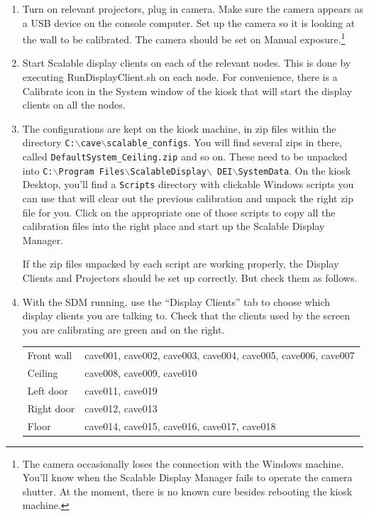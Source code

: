 \documentclass[11pt]{article}
\newcommand{\cmd}[1]{\texttt{#1}\xspace}
\newcommand{\menu}[1]{``#1''\xspace}
\newcommand{\button}[1]{\textsf{#1}\xspace}
\begin{document}
\begin{enumerate}

\item Turn on relevant projectors, plug in camera.  Make sure the camera
  appears as a USB device on the console computer.  Set up the camera
  so it is looking at the wall to be calibrated.  The camera should be
  set on Manual exposure.\footnote{The camera occasionally loses the
    connection with the Windows machine.  You'll know when the
    Scalable Display Manager fails to operate the camera shutter.  At
    the moment, there is no known cure besides rebooting the kiosk
    machine.} 

\item Start Scalable display clients on each of the relevant nodes.
  This is done by executing RunDisplayClient.sh on each node.  For
  convenience, there is a \button{Calibrate} icon in the System window of
  the kiosk that will start the display clients on all the nodes.

\newcommand{\bs}{$\backslash$}
\item The configurations are kept on the kiosk machine, in zip files
  within the directory \hbox{\cmd{C:\bs cave\bs scalable\_configs}}.
  You will find several zips in there, called
  \cmd{DefaultSystem\_Ceiling.zip} and so on.  These need to be
  unpacked into \hbox{\cmd{C:\bs Program Files\bs ScalableDisplay\bs
      DEI\bs SystemData}}.  On the kiosk Desktop, you'll find a
  \cmd{Scripts} directory with clickable Windows scripts you can use
  that will clear out the previous calibration and unpack the right
  zip file for you.  Click on the appropriate one of those scripts to
  copy all the calibration files into the right place and start up the
  Scalable Display Manager.

  If the zip files unpacked by each script are working properly, the
  Display Clients and Projectors should be set up correctly.  But
  check them as follows.

\item With the SDM running, use the \menu{Display Clients} tab to choose
  which display clients you are talking to.  Check that the clients
  used by the screen you are calibrating are 
  green and on the right. 

  \begin{center}
  \begin{tabular}{ll}
    Front wall & cave001, cave002, cave003, cave004, cave005, cave006,
                 cave007 \\
    Ceiling & cave008, cave009, cave010 \\
    Left door & cave011, cave019 \\
    Right door & cave012, cave013 \\
    Floor & cave014, cave015, cave016, cave017, cave018 \\ 
  \end{tabular}
\end{center}


\end{enumerate}
\end{document}
